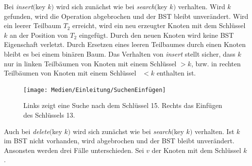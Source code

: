 \documentclass[a4paper,12pt]{article}
\begin{document}
Bei \textit{insert}$($key $k)$  wird sich zunächst wie bei  \textit{search}$($key $k)$ verhalten. Wird $k$ gefunden, wird die Operation abgebrochen und der BST bleibt unverändert. Wird ein leerer Teilbaum $T_2$ erreicht, wird ein neu erzeugter Knoten mit dem Schlüssel $k$ an der Position von $T_2$ eingefügt. Durch den neuen Knoten wird keine BST Eigenschaft verletzt. Durch Ersetzen eines leeren Teilbaumes durch einen Knoten bleibt es bei einem binären Baum. Das Verhalten von  \textit{insert} stellt sicher, dass $k$ nur in linken Teilbäumen von Knoten mit einem Schlüssel $> k$, bzw. in rechten Teilbäumen von Knoten mit einem Schlüssel~ $< k$ enthalten ist.    \\
\begin{figure}[H]
	\centering
	\texttt{[image: Medien/Einleitung/SuchenEinfügen]}
	\caption{Links zeigt eine Suche nach dem Schlüssel 15. Rechts das Einfügen des Schlüssels 13.}
	\label{fig:SuchenEinfügen}
\end{figure}
\noindent Auch bei \textit{delete}$($key $k)$ wird sich zunächst wie bei  \textit{search}$($key $k)$ verhalten. Ist $k$ im BST nicht vorhanden, wird abgebrochen und der BST bleibt unverändert. Ansonsten werden drei Fälle unterschieden.
Sei $v$ der Knoten mit dem Schlüssel $k$.
\end{document}
